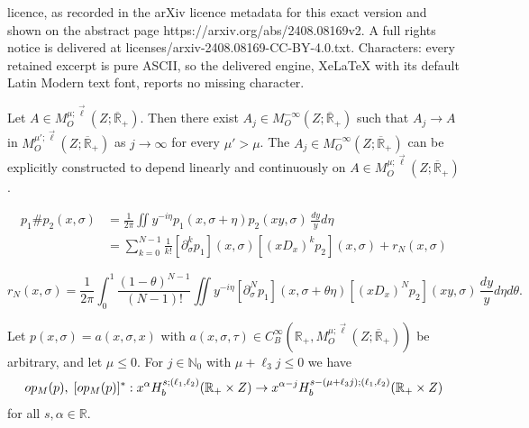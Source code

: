 \documentclass[10pt,a4paper]{amsart}
\def\N{\mathbb N}
\def\R{\mathbb R}
\def\opm{\textup{op}_{\textit{M}}}
\begin{document}
licence, as recorded in the arXiv licence metadata for this exact version and shown on the abstract page https://arxiv.org/abs/2408.08169v2. A full rights notice is delivered at licenses/arxiv-2408.08169-CC-BY-4.0.txt. Characters: every retained excerpt is pure ASCII, so the delivered engine, XeLaTeX with its default Latin Modern text font, reports no missing character.
\begin{lemma}\label{AnalyticSmoothingApprox}
Let $A \in M^{\mu;\vec{\ell}}_O(Z;\overline{\R}_+)$. Then there exist $A_j \in M^{-\infty}_O(Z;\overline{\R}_+)$ such that $A_j \to A$ in $M^{\mu';\vec{\ell}}_O(Z;\overline{\R}_+)$ as $j \to \infty$ for every $\mu' > \mu$. The $A_j \in M^{-\infty}_O(Z;\overline{\R}_+)$ can be explicitly constructed to depend linearly and continuously on $A \in M^{\mu;\vec{\ell}}_O(Z;\overline{\R}_+)$.
\end{lemma}

\begin{equation}\label{MelLeibniz}
\begin{aligned}
p_1{\#}p_2(x,\sigma) &= \frac{1}{2\pi}\iint y^{-i\eta}p_1(x,\sigma+\eta)p_2(xy,\sigma)\,\frac{dy}{y}d\eta \\
&= \sum\limits_{k=0}^{N-1}\frac{1}{k!}[\partial_{\sigma}^kp_1](x,\sigma)[(xD_x)^kp_2](x,\sigma) + r_N(x,\sigma)
\end{aligned}
\end{equation}

\begin{equation}\label{MelLeibnizRem}
r_N(x,\sigma) = \frac{1}{2\pi}\!\int_0^1\!\frac{(1-\theta)^{N-1}}{(N-1)!}\iint y^{-i\eta}[\partial_{\sigma}^Np_1](x,\sigma+\theta\eta)[(xD_{x})^Np_2](xy,\sigma)\,\frac{dy}{y}d\eta d\theta.
\end{equation}

\begin{lemma}\label{ImprovedMappingProps}
Let $p(x,\sigma) = a(x,\sigma,x)$ with $a(x,\sigma,\tau) \in C^{\infty}_B(\R_+,M^{\mu;\vec{\ell}}_O(Z;\overline{\R}_+))$ be arbitrary, and let $\mu \leq 0$. For $j \in \N_0$ with $\mu+\ell_3j \leq 0$ we have
$$
\opm(p),\; [\opm(p)]^* : x^{\alpha}H^{s;(\ell_1,\ell_2)}_b(\R_+\times Z) \to x^{\alpha-j}H^{s-(\mu+\ell_3 j);(\ell_1,\ell_2)}_b(\R_+\times Z)
$$
for all $s,\alpha \in \R$.
\end{lemma}
\end{document}
